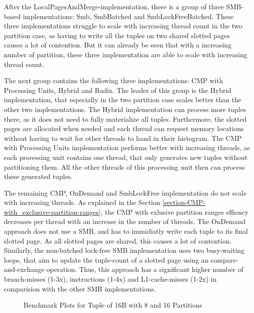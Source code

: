 After the LocalPagesAndMerge-implementation, there is a group of three \acf{SMB}-based implementations: Smb, SmbBatched and SmbLockFreeBatched.
These three implementations struggle to scale with increasing thread count in the two partition case, as having to write all the tuples on two shared slotted pages causes a lot of contention.
But it can already be seen that with a increasing number of partition, these three implementation are able to scale with increasing thread count.

The next group contains the following three implementations: \acf{CMP} with Processing Units, Hybrid and Radix.
The leader of this group is the Hybrid implementation, that especially in the two partition case scales better than the other two implementations.
The Hybrid implementation can process more tuples there, as it does not need to fully materialize all tuples.
Furthermore, the slotted pages are allocated when needed and each thread can request memory locations without having to wait for other threads to hand in their histogram.
The \ac{CMP} with Processing Units implementation performs better with increasing threads, as each processing unit contains one thread, that only generates new tuples without partitioning them.
All the other threads of this processing unit then can process these generated tuples.

The remaining \ac{CMP}, OnDemand and SmbLockFree implementation do not scale with increasing threads.
As explained in the Section \ref{section-CMP-with_exclusive-partition-ranges}, the \ac{CMP} with exlusive partition ranges effiency decreases per thread with an increase in the number of threads.
The OnDemand approach does not use a \ac{SMB}, and has to immidiatly write each tuple to its final slotted page.
As all slotted pages are shared, this causes a lot of contention.
Similarly, the non-batched lock-free \ac{SMB} implementation uses two busy-waiting loops, that aim to update the tuple-count of a slotted page using an compare-and-exchange operation.
Thus, this approach has a significant higher number of branch-misses (1-3x), instructions (1-4x) and L1-cache-misses (1-2x) in comparision with the other \ac{SMB} implementations.
\begin{figure}[h]
  \centering
  \begin{subfigure}{.49\textwidth}
    \centering
    \resizebox{\linewidth}{!}{}
  \end{subfigure}
  \begin{subfigure}{.49\textwidth}
    \centering
    \resizebox{\linewidth}{!}{}
  \end{subfigure}
  \caption[Shuffle Benchmark Plots for Tuple of 16B with 8 and 16 Partitions]{Benchmark Plots for Tuple of 16B with 8 and 16 Partitions}
  \label{plot-shuffle-16B-8-16}
\end{figure}

